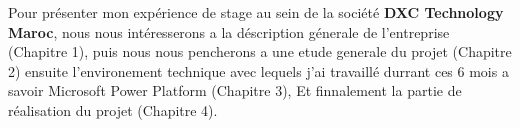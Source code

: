 Pour présenter mon expérience de stage au sein de la société \textbf{DXC Technology Maroc}, nous nous intéresserons a la déscription génerale de l'entreprise (Chapitre 1), puis nous nous pencherons a une etude generale du projet (Chapitre 2) ensuite l'environement technique avec lequels j'ai travaillé durrant ces 6 mois a savoir Microsoft Power Platform (Chapitre 3), Et finnalement la partie de réalisation du projet (Chapitre 4).

\newpage